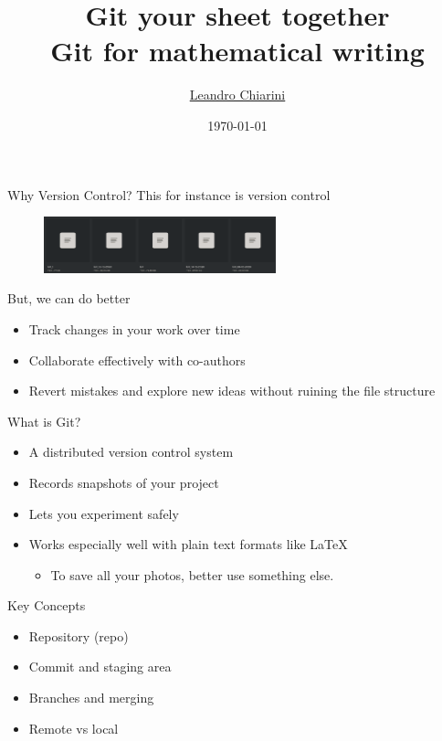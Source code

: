 \documentclass[12pt,t]{beamer}
\title{{\Huge Git your sheet together} \\ Git for mathematical writing}
\author{\href{http://lchiarini.com}{Leandro Chiarini}}
\institute{Durham University}
\date{\today \\
	\vspace{2em}
}
\begin{document}
{
\frame{ \titlepage
   } }

\begin{frame}{Why Version Control?}
	\pause
	This for instance is version control
		\begin{figure}[ht]
		    \centering
		    \includegraphics[width=0.6\textwidth]{figs/ScreenShot-without-git.png}
		\end{figure}
		\pause

	But, we can do better
\begin{itemize}
		\pause
    \item Track changes in your work over time
		\pause
    \item Collaborate effectively with co-authors
		\pause
    \item Revert mistakes and explore new ideas without ruining the file structure
\end{itemize}
\end{frame}

\begin{frame}{What is Git?}
\begin{itemize}
    \item A distributed version control system
		\vspace{1em}
		\pause
    \item Records snapshots of your project
		\vspace{1em}
		\pause
    \item Lets you experiment safely
		\vspace{1em}
		\pause
    \item Works especially well with plain text formats like \LaTeX
		\pause 
		\vspace{.5em}
		\begin{itemize}
			\item To save all your photos, better use something else.
		\end{itemize}
		
\end{itemize}
\end{frame}

\begin{frame}{Key Concepts}
\begin{itemize}
    \item Repository (repo)
		\pause
    \item Commit and staging area
		\pause
    \item Branches and merging
		\pause
    \item Remote vs local
\end{itemize}
\end{frame}
\end{document}
